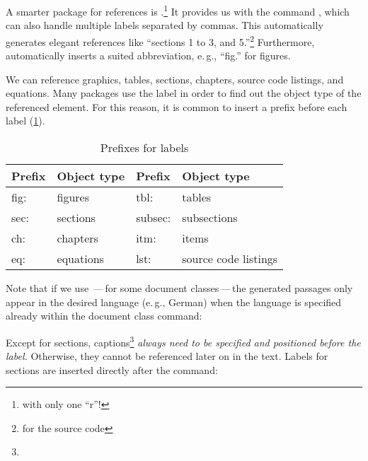 A smarter package for references is .\footnote{with only one 
\enquote{r}!}
It provides us with the command , 
which can also handle multiple labels separated by commas.
This automatically generates elegant references like \enquote{sections 1 to 3, 
and 5.}\footnote{for the source code }
Furthermore,  automatically inserts 
a suited abbreviation, e.\,g., \enquote{fig.} for figures.

We can reference graphics, tables, sections, chapters, source code listings, 
and equations. 
Many packages use the label in order to find out the object type of the 
referenced element.
For this reason, it is common to insert a prefix before each label 
(\cref{lst:reference-prefixes}).

\begin{table}[H]
	\centering
	\begin{tabular}{@{}llll@{}}
		\toprule
		Prefix & Object type & Prefix & Object type \\ \midrule
		fig: & figures & tbl:    & tables            \\ 
		sec: & sections  & subsec: & subsections     \\
		ch:  & chapters     & itm:    & items \\
		eq:  & equations & lst:    & source code listings  \\ \bottomrule
	\end{tabular}
	\caption{Prefixes for labels}
	\label{lst:reference-prefixes}
\end{table}

Note that if we use \,---\,for some 
document classes\,---\,the generated passages only appear in the desired 
language (e.\,g., German) when the language is specified already within the 
document class command:


\noindent Except for sections, captions\footnote{} \emph{always need to be specified and positioned before the 
label}\textit{.} Otherwise, they cannot be referenced later on in the text.
Labels for sections are inserted directly after the command:


